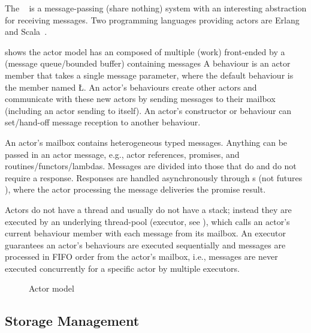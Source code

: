 \documentclass[openright,twoside]{report}
\begin{document}
The ~\cite{Hewitt73,Actors} is a message-passing (share nothing) system with an interesting abstraction for receiving messages.
Two programming languages providing actors are Erlang~\cite{Erlang} and Scala~\cite{Scala}.

 shows the actor model has an  composed of multiple  (work) front-ended by a  (message queue/bounded buffer) containing messages
A behaviour is an actor member that takes a single message parameter, where the default behaviour is the member named \LGinlinetrue\LGbegin\lgrinde\L{}\endlgrinde\LGend{}.
An actor's behaviours create other actors and communicate with these new actors by sending messages to their mailbox (including an actor sending to itself).
An actor's constructor or behaviour can set/hand-off message reception to another behaviour.

An actor's mailbox contains heterogeneous typed messages.
Anything can be passed in an actor message, e.g., actor references, promises, and routines/functors/lambdas.
Messages are divided into those that do and do not require a response.
Responses are handled asynchronously through \emph{}s (not futures ), where the actor processing the message deliveries the promise result.

Actors do not have a thread and usually do not have a stack;
instead they are executed by an underlying thread-pool (executor, see ), which calls an actor's current behaviour member with each message from its mailbox.
An executor guarantees an actor's behaviours are executed sequentially and messages are processed in FIFO order from the actor's mailbox, i.e., messages are never executed concurrently for a specific actor by multiple executors.

\begin{figure}
\centering

\caption{Actor model}
\label{f:ActorModel}
\end{figure}


\subsection{Storage Management}
\end{document}
